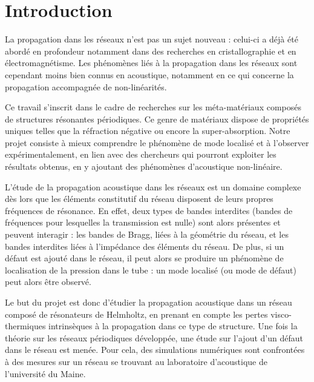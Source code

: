 \chapter*{Introduction}


La propagation dans les réseaux n'est pas un sujet nouveau : celui-ci a déjà été abordé en profondeur notamment dans des recherches en cristallographie et en électromagnétisme. Les phénomènes liés à la propagation dans les réseaux sont cependant moins bien connus en acoustique, notamment en ce qui concerne la propagation accompagnée de non-linéarités.


Ce travail s'inscrit dans le cadre de recherches sur les méta-matériaux composés de structures résonantes périodiques. Ce genre de matériaux dispose de propriétés uniques telles que la réfraction négative ou encore la super-absorption. Notre projet consiste à mieux comprendre le phénomène de mode localisé et à l'observer expérimentalement, en lien avec des chercheurs qui pourront exploiter les résultats obtenus, en y ajoutant des phénomènes d'acoustique non-linéaire.


L'étude de la propagation acoustique dans les réseaux est un domaine complexe dès lors que les éléments constitutif du réseau disposent de leurs propres fréquences de résonance. En effet, deux types de bandes interdites (bandes de fréquences pour lesquelles la transmission est nulle) sont alors présentes et peuvent interagir : les bandes de Bragg, liées à la géométrie du réseau, et les bandes interdites liées à l'impédance des éléments du réseau. De plus, si un défaut est ajouté dans le réseau, il peut alors se produire un phénomène de localisation de la pression dans le tube : un mode localisé (ou mode de défaut) peut alors être observé.

\bigskip
Le but du projet est donc d'étudier la propagation acoustique dans un réseau composé de résonateurs de Helmholtz, en prenant en compte les pertes visco-thermiques intrinsèques à la propagation dans ce type de structure. Une fois la théorie sur les réseaux périodiques développée, une étude sur l'ajout d'un défaut dans le réseau est menée. Pour cela, des simulations numériques sont confrontées à des mesures sur un réseau se trouvant au laboratoire d'acoustique de l'université du Maine.

%
